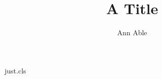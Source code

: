 \begin{filecontents*}[overwrite]{just.cls}
\setcounter{email}{1}
\newcommand{\email}[1]{\protected@xdef\@thanks{\@thanks
  \protect\footnotetext[0]{\hspace*{-8pt}\arabic{email})\,{E-mail:\,}#1}}\stepcounter{email}}
\newcommand{\emails}[1]{\footnotetext[0]{\hspace*{-8pt}\arabic{email})\,{E-mail:\,}#1}\stepcounter{email}}
\renewcommand\maketitle{\par\begingroup\newpage\@maketitle\@thanks\endgroup
  \setcounter{footnote}{0}\global\let\thanks\relax\global\let\maketitle\relax
  \global\let\@maketitle\relax\global\let\@thanks\@empty\global\let\@author\@empty\global\let\@title\@empty}
\renewcommand\@maketitle{\begin{center}\let\footnote\thanks{\Large\bf\@title\par}%
  {\normalsize\lineskip .5em\vskip 4mm\begin{tabular}[t]{c}\normalsize\@author\end{tabular}}\end{center}}
\newcommand{\address}[1]{\vspace*{0mm}
  \begin{center}\vskip -5mm\begin{center}{\footnotesize #1}\end{center}\end{center}}
\end{filecontents*}
\documentclass{just}

\title{A Title}
\author{Ann Able}
\maketitle
\address{Center for Theory, Univ A, Town, Country}
Body.

